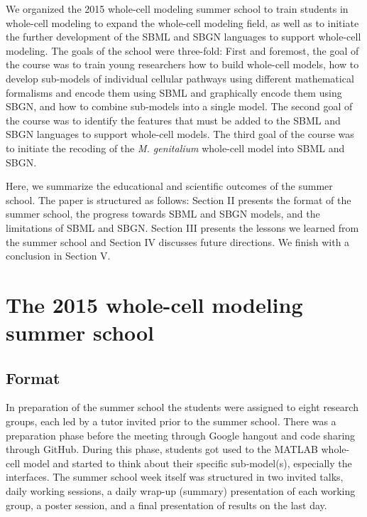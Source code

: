 \documentclass[journal,transmag]{IEEEtran}
\begin{document}
We organized the 2015 whole-cell modeling summer school to train students in whole-cell modeling to expand the whole-cell modeling field, as well as to initiate the further development of the SBML and SBGN languages to support whole-cell modeling. 
The goals of the school were three-fold: 
First and foremost, the goal of the course was to train young researchers how to build whole-cell models, how to develop sub-models of individual cellular pathways using different mathematical formalisms and encode them using SBML and graphically encode them using SBGN, and how to combine sub-models into a single model. 
The second goal of the course was to identify the features that must be added to the SBML and SBGN languages to support whole-cell models. 
The third goal of the course was to initiate the recoding of the \textit{M. genitalium} whole-cell model into SBML and SBGN.

Here, we summarize the educational and scientific outcomes of the summer school. The paper is structured as follows: 
Section II presents the format of the summer school, the progress towards SBML and SBGN models, and the limitations of SBML and SBGN. 
Section III presents the lessons we learned from the summer school and Section IV discusses future directions. 
We finish with a conclusion in Section V. 

\section{The 2015 whole-cell modeling summer school}

\subsection{Format}
In preparation of the summer school the students were assigned to eight research groups, each led by a tutor invited prior to the summer school. 
There was a preparation phase before the meeting through Google hangout and code sharing through GitHub. During this phase, students got used to the MATLAB whole-cell model and started to think about their specific sub-model(s), especially the interfaces.
The summer school week itself was structured in two invited talks, daily working sessions, a daily wrap-up (summary) presentation of each working group, a poster session, and a final presentation of results on the last day.
\end{document}
